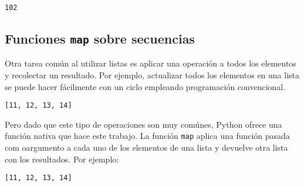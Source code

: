 \begin{verbatim}
102
\end{verbatim}

\subsection{\texorpdfstring{Funciones \texttt{map} sobre
secuencias}{Funciones map sobre secuencias}}\label{funciones-map-sobre-secuencias}

Otra tarea común al utilizar listas es aplicar una operación a todos los
elementos y recolectar un resultado. Por ejemplo, actualizar todos los
elementos en una lista se puede hacer fácilmente con un ciclo empleando
programación convencional.

\begin{Shaded}
\begin{Highlighting}[]
\OperatorTok{=}\NormalTok{ [}\NormalTok{,}\NormalTok{,}\NormalTok{,}\NormalTok{]}
\OperatorTok{=}\NormalTok{ []}

\OperatorTok{+}\NormalTok{)}
\end{Highlighting}
\end{Shaded}

\begin{verbatim}
[11, 12, 13, 14]
\end{verbatim}

Pero dado que este tipo de operaciones son muy comúnes, Python ofrece
una función nativa que hace este trabajo. La función \texttt{map} aplica
una función pasada com oargumento a cada uno de los elementos de una
lista y devuelve otra lista con los resultados. Por ejemplo:

\begin{Shaded}
\begin{Highlighting}[]
    \OperatorTok{+}

\NormalTok{(}
\end{Highlighting}
\end{Shaded}

\begin{verbatim}
[11, 12, 13, 14]
\end{verbatim}

